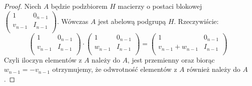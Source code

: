 \documentclass[licencjacka]{pracamgr}
\begin{document}
\begin{proof}
  Niech $A$ będzie podzbiorem $H$ macierzy o postaci blokowej
  $
    \left( \begin{array}{cc}
    1 & 0_{n-1} \\
    v_{n-1} & I_{n-1} \\
    \end{array} \right)
  $.
  Wówczas $A$ jest abelową podgrupą $H$.
  Rzeczywiście:
  $$
    \left( \begin{array}{cc} 1 & 0_{n-1} \\ v_{n-1} & I_{n-1} \\ \end{array} \right) \cdot
    \left( \begin{array}{cc} 1 & 0_{n-1} \\ w_{n-1} & I_{n-1} \\ \end{array} \right) =
    \left( \begin{array}{cc} 1 & 0_{n-1} \\ v_{n-1} + w_{n-1} & I_{n-1} \\ \end{array} \right)
  $$
  Czyli iloczyn elementów z $A$ należy do $A$, jest przemienny oraz biorąc $w_{n-1} = -v_{n-1}$
  otrzymujemy, że odwrotność elementów z $A$ również należy do $A$.
  

\end{proof}
\end{document}

